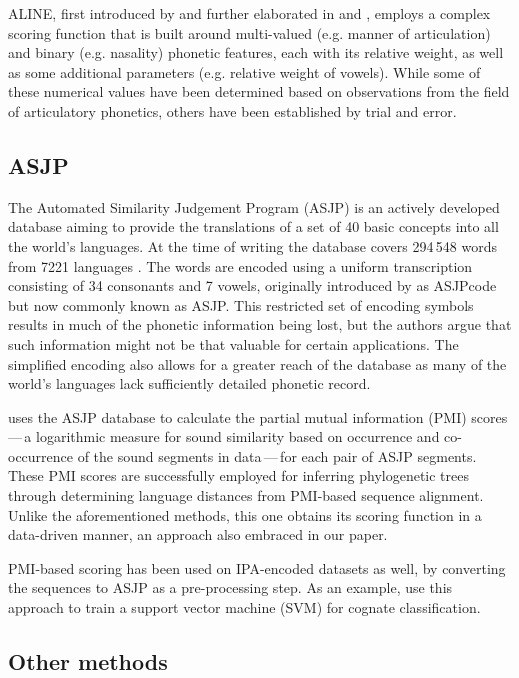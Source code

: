 \documentclass[a4paper]{report}
\begin{document}
ALINE, first introduced by \citet{2000_Kondrak} and further elaborated in \citet{2002_Kondrak_Hirst} and \citet{2003_Kondrak},
employs a complex scoring function that is built around multi-valued (e.g. manner of articulation) and binary (e.g. nasality) phonetic features,
each with its relative weight, as well as some additional parameters (e.g. relative weight of vowels).
While some of these numerical values have been determined based on observations from the field of articulatory phonetics,
others have been established by trial and error.


\subsection{ASJP}

The Automated Similarity Judgement Program (ASJP) is an actively developed database aiming to provide
the translations of a set of 40 basic concepts into all the world's languages.
At the time of writing the database covers 294\,548 words from 7221 languages \citep{2016_Wichmann_al}.
The words are encoded using a uniform transcription consisting of 34 consonants and 7 vowels,
originally introduced by \citet{2008_Brown_al} as ASJPcode but now commonly known as ASJP.
This restricted set of encoding symbols results in much of the phonetic information being lost,
but the authors argue that such information might not be that valuable for certain applications.
The simplified encoding also allows for a greater reach of the database as many of the world's languages lack sufficiently detailed phonetic record.

\citet{2013_Jäger} uses the ASJP database to calculate the partial mutual information (PMI) scores\,---\,a logarithmic measure
for sound similarity based on occurrence and co-occurrence of the sound segments in data\,---\,for each pair of ASJP segments.
These PMI scores are successfully employed for inferring phylogenetic trees through determining language distances from PMI-based sequence alignment.
Unlike the aforementioned methods, this one obtains its scoring function in a data-driven manner, an approach also embraced in our paper.

PMI-based scoring has been used on IPA-encoded datasets as well, by converting the sequences to ASJP as a pre-processing step.
As an example, \citet{2016_Jäger_Sofroniev} use this approach to train a support vector machine (SVM) for cognate classification.


\subsection{Other methods}
\end{document}
